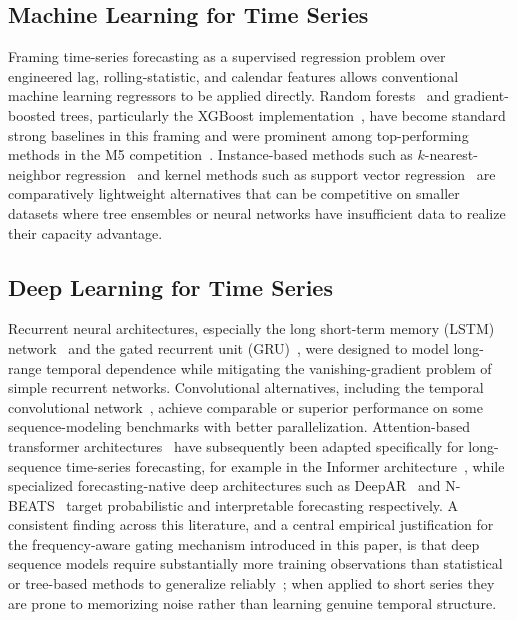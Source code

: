 \subsection{Machine Learning for Time Series}
Framing time-series forecasting as a supervised regression problem over engineered lag, rolling-statistic, and calendar features allows conventional machine learning regressors to be applied directly. Random forests~\cite{breiman2001randomforest} and gradient-boosted trees, particularly the XGBoost implementation~\cite{chen2016xgboost}, have become standard strong baselines in this framing and were prominent among top-performing methods in the M5 competition~\cite{makridakis2022m5}. Instance-based methods such as $k$-nearest-neighbor regression~\cite{cover1967knn} and kernel methods such as support vector regression~\cite{cortes1995svm} are comparatively lightweight alternatives that can be competitive on smaller datasets where tree ensembles or neural networks have insufficient data to realize their capacity advantage.

\subsection{Deep Learning for Time Series}
Recurrent neural architectures, especially the long short-term memory (LSTM) network~\cite{hochreiter1997lstm,gers2000forget} and the gated recurrent unit (GRU)~\cite{cho2014gru}, were designed to model long-range temporal dependence while mitigating the vanishing-gradient problem of simple recurrent networks. Convolutional alternatives, including the temporal convolutional network~\cite{bai2018tcn}, achieve comparable or superior performance on some sequence-modeling benchmarks with better parallelization. Attention-based transformer architectures~\cite{vaswani2017attention} have subsequently been adapted specifically for long-sequence time-series forecasting, for example in the Informer architecture~\cite{zhou2021informer}, while specialized forecasting-native deep architectures such as DeepAR~\cite{salinas2020deepar} and N-BEATS~\cite{oreshkin2020nbeats} target probabilistic and interpretable forecasting respectively. A consistent finding across this literature, and a central empirical justification for the frequency-aware gating mechanism introduced in this paper, is that deep sequence models require substantially more training observations than statistical or tree-based methods to generalize reliably~\cite{lim2021survey}; when applied to short series they are prone to memorizing noise rather than learning genuine temporal structure.


